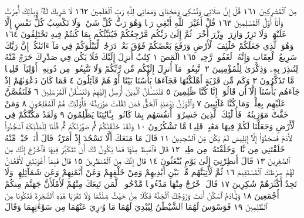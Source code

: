 مِنَ ٱلْمُشْرِكِينَ ١٦١ قُلْ إِنَّ صَلَاتِي وَنُسُكِي وَمَحْيَايَ وَمَمَاتِي لِلَّهِ
رَبِّ ٱلْعَٰلَمِينَ ١٦٢ لَا شَرِيكَ لَهُۥۖ وَبِذَٰلِكَ أُمِرْتُ وَأَنَا۠ أَوَّلُ ٱلْمُسْلِمِينَ ١٦٣
قُلْ أَغَيْرَ ٱللَّهِ أَبْغِي رَبࣰّا وَهُوَ رَبُّ كُلِّ شَيْءࣲۚ وَلَا تَكْسِبُ كُلُّ
نَفْسٍ إِلَّا عَلَيْهَاۚ وَلَا تَزِرُ وَازِرَةࣱ وِزْرَ أُخْرَىٰۚ ثُمَّ إِلَىٰ رَبِّكُم
مَّرْجِعُكُمْ فَيُنَبِّئُكُم بِمَا كُنتُمْ فِيهِ تَخْتَلِفُونَ ١٦٤ وَهُوَ ٱلَّذِي جَعَلَكُمْ
خَلَٰٓئِفَ ٱلْأَرْضِ وَرَفَعَ بَعْضَكُمْ فَوْقَ بَعْضࣲ دَرَجَٰتࣲ لِّيَبْلُوَكُمْ فِي
مَآ ءَاتَىٰكُمْۗ إِنَّ رَبَّكَ سَرِيعُ ٱلْعِقَابِ وَإِنَّهُۥ لَغَفُورࣱ رَّحِيمُۢ ١٦٥
الٓمٓصٓ ١ كِتَٰبٌ أُنزِلَ إِلَيْكَ فَلَا يَكُن فِي صَدْرِكَ حَرَجࣱ مِّنْهُ
لِتُنذِرَ بِهِۦ وَذِكْرَىٰ لِلْمُؤْمِنِينَ ٢ ٱتَّبِعُوا۟ مَآ أُنزِلَ إِلَيْكُم
مِّن رَّبِّكُمْ وَلَا تَتَّبِعُوا۟ مِن دُونِهِۦٓ أَوْلِيَآءَۗ قَلِيلࣰا مَّا تَذَكَّرُونَ ٣
وَكَم مِّن قَرْيَةٍ أَهْلَكْنَٰهَا فَجَآءَهَا بَأْسُنَا بَيَٰتًا أَوْ هُمْ
قَآئِلُونَ ٤ فَمَا كَانَ دَعْوَىٰهُمْ إِذْ جَآءَهُم بَأْسُنَآ إِلَّآ أَن قَالُوٓا۟
إِنَّا كُنَّا ظَٰلِمِينَ ٥ فَلَنَسْـَٔلَنَّ ٱلَّذِينَ أُرْسِلَ إِلَيْهِمْ وَلَنَسْـَٔلَنَّ
ٱلْمُرْسَلِينَ ٦ فَلَنَقُصَّنَّ عَلَيْهِم بِعِلْمࣲۖ وَمَا كُنَّا غَآئِبِينَ ٧
وَٱلْوَزْنُ يَوْمَئِذٍ ٱلْحَقُّۚ فَمَن ثَقُلَتْ مَوَٰزِينُهُۥ فَأُو۟لَٰٓئِكَ هُمُ
ٱلْمُفْلِحُونَ ٨ وَمَنْ خَفَّتْ مَوَٰزِينُهُۥ فَأُو۟لَٰٓئِكَ ٱلَّذِينَ خَسِرُوٓا۟
أَنفُسَهُم بِمَا كَانُوا۟ بِـَٔايَٰتِنَا يَظْلِمُونَ ٩ وَلَقَدْ مَكَّنَّٰكُمْ
فِي ٱلْأَرْضِ وَجَعَلْنَا لَكُمْ فِيهَا مَعَٰيِشَۗ قَلِيلࣰا مَّا تَشْكُرُونَ ١٠
وَلَقَدْ خَلَقْنَٰكُمْ ثُمَّ صَوَّرْنَٰكُمْ ثُمَّ قُلْنَا لِلْمَلَٰٓئِكَةِ
ٱسْجُدُوا۟ لِأٓدَمَ فَسَجَدُوٓا۟ إِلَّآ إِبْلِيسَ لَمْ يَكُن مِّنَ ٱلسَّٰجِدِينَ ١١
قَالَ مَا مَنَعَكَ أَلَّا تَسْجُدَ إِذْ أَمَرْتُكَۖ قَالَ أَنَا۠ خَيْرࣱ مِّنْهُ خَلَقْتَنِي مِن نَّارࣲ
وَخَلَقْتَهُۥ مِن طِينࣲ ١٢ قَالَ فَٱهْبِطْ مِنْهَا فَمَا يَكُونُ لَكَ أَن تَتَكَبَّرَ
فِيهَا فَٱخْرُجْ إِنَّكَ مِنَ ٱلصَّٰغِرِينَ ١٣ قَالَ أَنظِرْنِيٓ إِلَىٰ يَوْمِ يُبْعَثُونَ ١٤
قَالَ إِنَّكَ مِنَ ٱلْمُنظَرِينَ ١٥ قَالَ فَبِمَآ أَغْوَيْتَنِي لَأَقْعُدَنَّ لَهُمْ
صِرَٰطَكَ ٱلْمُسْتَقِيمَ ١٦ ثُمَّ لَأٓتِيَنَّهُم مِّنۢ بَيْنِ أَيْدِيهِمْ وَمِنْ خَلْفِهِمْ
وَعَنْ أَيْمَٰنِهِمْ وَعَن شَمَآئِلِهِمْۖ وَلَا تَجِدُ أَكْثَرَهُمْ شَٰكِرِينَ ١٧ قَالَ
ٱخْرُجْ مِنْهَا مَذْءُومࣰا مَّدْحُورࣰاۖ لَّمَن تَبِعَكَ مِنْهُمْ لَأَمْلَأَنَّ جَهَنَّمَ مِنكُمْ
أَجْمَعِينَ ١٨ وَيَٰٓـَٔادَمُ ٱسْكُنْ أَنتَ وَزَوْجُكَ ٱلْجَنَّةَ فَكُلَا مِنْ حَيْثُ
شِئْتُمَا وَلَا تَقْرَبَا هَٰذِهِ ٱلشَّجَرَةَ فَتَكُونَا مِنَ ٱلظَّٰلِمِينَ ١٩ فَوَسْوَسَ
لَهُمَا ٱلشَّيْطَٰنُ لِيُبْدِيَ لَهُمَا مَا وُۥرِيَ عَنْهُمَا مِن سَوْءَٰتِهِمَا وَقَالَ
